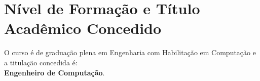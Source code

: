 \section{Nível de Formação e Título Acadêmico Concedido}
O curso é de graduação plena em Engenharia com Habilitação em Computação e a titulação concedida é:\\
\textbf{Engenheiro de Computação}.